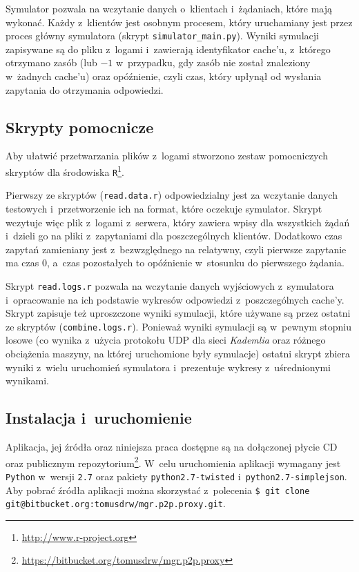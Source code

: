 \documentclass[a4paper,11pt]{scrartcl}
\newcommand{\f}{\texttt}
\newcommand{\keszy}{cache'y}
\newcommand{\keszu}{cache'u}
\begin{document}
Symulator pozwala na wczytanie danych o~klientach i~żądaniach, które mają wykonać. Każdy z~klientów jest osobnym procesem, który uruchamiany jest przez proces główny symulatora (skrypt \f{simulator\_main.py}). Wyniki symulacji zapisywane są do pliku z~logami i~zawierają identyfikator \keszu, z~którego otrzymano zasób (lub $-1$ w~przypadku, gdy zasób nie został znaleziony w~żadnych \keszu) oraz opóźnienie, czyli czas, który upłynął od wysłania zapytania do otrzymania odpowiedzi.

\subsection{Skrypty pomocnicze}
Aby ułatwić przetwarzania plików z~logami stworzono zestaw pomocniczych skryptów dla środowiska \f{R}\footnote{\url{http://www.r-project.org}}. 

Pierwszy ze skryptów (\f{read.data.r}) odpowiedzialny jest za wczytanie danych testowych i~przetworzenie ich na format, które oczekuje symulator. Skrypt wczytuje więc plik z~logami z~serwera, który zawiera wpisy dla wszystkich żądań i~dzieli go na pliki z~zapytaniami dla poszczególnych klientów. Dodatkowo czas zapytań zamieniany jest z~bezwzględnego na relatywny, czyli pierwsze zapytanie ma czas $0$, a~czas pozostałych to opóźnienie w~stosunku do pierwszego żądania.

Skrypt \f{read.logs.r} pozwala na wczytanie danych wyjściowych z~symulatora i~opracowanie na ich podstawie wykresów odpowiedzi z~poszczególnych \keszy. Skrypt zapisuje też uproszczone wyniki symulacji, które używane są przez ostatni ze skryptów (\f{combine.logs.r}). Ponieważ wyniki symulacji są w~pewnym stopniu losowe (co wynika z~użycia protokołu UDP dla sieci \textit{Kademlia} oraz różnego obciążenia maszyny, na której uruchomione były symulacje) ostatni skrypt zbiera wyniki z~wielu uruchomień symulatora i~prezentuje wykresy z~uśrednionymi wynikami.

\subsection{Instalacja i~uruchomienie}
\label{sect_impl_install}
Aplikacja, jej źródła oraz niniejsza praca dostępne są na dołączonej płycie CD oraz publicznym repozytorium\footnote{\url{https://bitbucket.org/tomusdrw/mgr.p2p.proxy}}. W~celu uruchomienia aplikacji wymagany jest \f{Python} w~wersji \f{2.7} oraz pakiety \f{python2.7-twisted} i~\f{python2.7-simplejson}. Aby pobrać źródła aplikacji można skorzystać z~polecenia \f{\$ git clone git@bitbucket.org:tomusdrw/mgr.p2p.proxy.git}.
\end{document}
